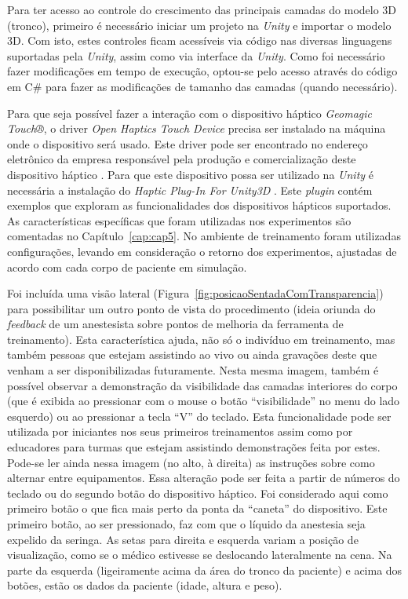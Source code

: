 Para ter acesso ao controle do crescimento das principais camadas do modelo 3D (tronco), primeiro é necessário iniciar um projeto na \textit{Unity} e importar o modelo 3D. Com isto, estes controles ficam acessíveis via código nas diversas linguagens suportadas pela \textit{Unity}, assim como via interface da \textit{Unity}. Como foi necessário fazer modificações em tempo de execução, optou-se pelo acesso através do código em C\# para fazer as modificações de tamanho das camadas (quando necessário). 

Para que seja possível fazer a interação com o dispositivo háptico \textit{Geomagic Touch®}, o driver \textit{Open Haptics Touch Device} precisa ser instalado na máquina onde o dispositivo será usado. Este driver pode ser encontrado no endereço eletrônico da empresa responsável pela produção e comercialização deste dispositivo háptico \cite{3DSystemsTouch2018}. Para que este dispositivo possa ser utilizado na \textit{Unity} é necessária a instalação do \textit{Haptic Plug-In For Unity3D} \cite{Poyade2014}. Este \textit{plugin} contém exemplos que exploram as funcionalidades dos dispositivos hápticos suportados. As características específicas que foram utilizadas nos experimentos são comentadas no Capítulo~\ref{cap:cap5}. No ambiente de treinamento foram utilizadas configurações, levando em consideração o retorno dos experimentos, ajustadas de acordo com cada corpo de paciente em simulação. 

Foi incluída uma visão lateral (Figura~\ref{fig:posicaoSentadaComTransparencia}) para possibilitar um outro ponto de vista do procedimento (ideia oriunda do \textit{feedback} de um anestesista sobre pontos de melhoria da ferramenta de treinamento). Esta característica ajuda, não só o indivíduo em treinamento, mas também pessoas que estejam assistindo ao vivo ou ainda gravações deste que venham a ser disponibilizadas futuramente. Nesta mesma imagem, também é possível observar a demonstração da visibilidade das camadas interiores do corpo (que é exibida ao pressionar com o mouse o botão ``visibilidade'' no menu do lado esquerdo) ou ao pressionar a tecla ``V'' do teclado. Esta funcionalidade pode ser utilizada por iniciantes nos seus primeiros treinamentos assim como por educadores para turmas que estejam assistindo demonstrações feita por estes. Pode-se ler ainda nessa imagem (no alto, à direita) as instruções sobre como alternar entre equipamentos. Essa alteração pode ser feita a partir de números do teclado ou do segundo botão do dispositivo háptico. Foi considerado aqui como primeiro botão o que fica mais perto da ponta da ``caneta'' do dispositivo. Este primeiro botão, ao ser pressionado, faz com que o líquido da anestesia seja expelido da seringa. As setas para direita e esquerda variam a posição de visualização, como se o médico estivesse se deslocando lateralmente na cena. Na parte da esquerda (ligeiramente acima da área do tronco da paciente) e acima dos botões, estão os dados da paciente (idade, altura e peso). 

